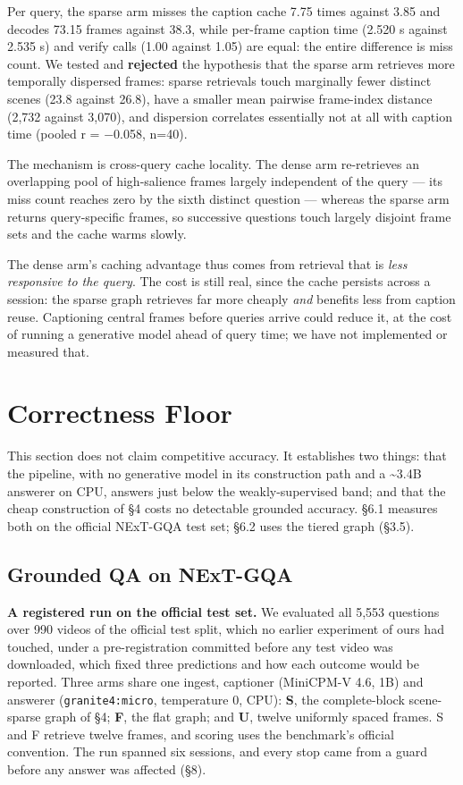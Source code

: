 \documentclass[sigconf,review,anonymous]{acmart}
\begin{document}
Per query, the sparse arm misses the caption cache 7.75 times against 3.85 and decodes 73.15
frames against 38.3, while per-frame caption time (2.520 s against 2.535 s) and verify calls
(1.00 against 1.05) are equal: the entire difference is miss count. We tested and
\textbf{rejected} the hypothesis that the sparse arm retrieves more temporally dispersed frames:
sparse retrievals touch marginally fewer distinct scenes (23.8 against 26.8), have a smaller
mean pairwise frame-index distance (2,732 against 3,070), and dispersion correlates
essentially not at all with caption time (pooled r = \ensuremath{-}0.058, n=40).

The mechanism is cross-query cache locality. The dense arm re-retrieves an overlapping pool
of high-salience frames largely independent of the query --- its miss count reaches zero by
the sixth distinct question --- whereas the sparse arm returns query-specific frames, so
successive questions touch largely disjoint frame sets and the cache warms slowly.

The dense arm's caching advantage thus comes from retrieval that is \emph{less responsive to the
query}. The cost is still real, since the cache persists across a session: the sparse graph
retrieves far more cheaply \emph{and} benefits less from caption reuse. Captioning
central frames before queries arrive could reduce it, at the cost of running a generative model
ahead of query time; we have not implemented or measured that.

\section{Correctness Floor}

This section does not claim competitive accuracy. It establishes two things: that the pipeline,
with no generative model in its construction path and a \textasciitilde3.4B answerer on CPU, answers
just below the weakly-supervised band; and that the cheap construction of §4 costs no
detectable grounded accuracy. §6.1 measures both on the official NExT-GQA test set; §6.2 uses
the tiered graph (§3.5).

\subsection{Grounded QA on NExT-GQA}

\textbf{A registered run on the official test set.} We evaluated all 5,553 questions over 990
videos of the official test split, which no earlier experiment of ours had touched, under a
pre-registration committed before any test video was downloaded, which fixed three
predictions and how each outcome would be reported. Three arms share one
ingest, captioner (MiniCPM-V 4.6, 1B) and answerer (\texttt{granite4:micro}, temperature 0, CPU):
\textbf{S}, the complete-block scene-sparse graph of §4; \textbf{F}, the flat graph; and \textbf{U},
twelve uniformly spaced frames. S and F retrieve twelve frames, and scoring uses the
benchmark's official convention. The run spanned six sessions, and every stop came from a guard
before any answer was affected (§8).
\end{document}
